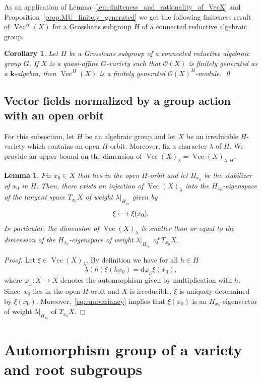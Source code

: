 \documentclass[JEP,XML,SOM,Unicode]{cedram}
\let\mathcal\mathscr
\def\mto{\mathchoice{\longmapsto}{\mapsto}{\mapsto}{\mapsto}}
\theoremstyle{plain}
\newtheorem{lemma}[theorem]{Lemma}
\newtheorem{corollary}[theorem]{Corollary}
\theoremstyle{definition}
\DeclareMathOperator{\Ve}{Vec}
\newcommand{\OO}{\mathcal{O}}
\newcommand{\kk}{{\boldsymbol{k}}}
\begin{document}
As an application of Lemma~\ref{lem.finiteness_and_rationality_of_VecX} and
Proposition~\ref{prop.MU_finitely_generated} we get the following
finiteness result of $\Ve^{H}(X)$ for a Grosshans subgroup $H$ of a connected reductive
algebraic group.

\begin{corollary}
\label{cor.VecUX_finitely_generated}
Let $H$ be a Grosshans subgroup of a connected reductive algebraic group
$G$. If $X$ is a quasi-affine $G$-variety
such that $\OO(X)$ is finitely generated as a $\kk$-algebra, then
$\Ve^{H}(X)$ is a finitely generated $\OO(X)^{H}$-module. \qed
\end{corollary}

\subsection{Vector fields normalized by a group action with an open orbit}

For this subsection, let $H$ be an algebraic group and let $X$ be an irreducible
$H$-variety which contains an open $H$-orbit.
Moreover, fix a character $\lambda$ of $H$. We provide an upper bound on the dimension of
$\Ve(X)_\lambda = \Ve(X)_{\lambda, H}$.

\begin{lemma}
\label{lem:Normalized_Derivations}
Fix $x_0 \in X$ that lies in the open $H$-orbit and let $H_{x_0}$ be
the stabilizer of $x_0$ in $H$. Then, there exists an injection
of $\Ve(X)_\lambda$ into the $H_{x_0}$-eigenspace of the tangent space $T_{x_0} X$
of weight $\lambda |_{H_{x_0}}$ given by
\[
\xi \mto \xi(x_0).
\]
In particular, the dimension of $\Ve(X)_\lambda$ is smaller than or equal to the
dimension of the
$H_{x_0}$-eigenspace of weight $\lambda |_{H_{x_0}}$ of $T_{x_0} X$.
\end{lemma}

\begin{proof}
Let $\xi \in \Ve(X)_\lambda$. By definition we have for all $h \in H$
\[
\label{eq:equivariancy}
\tag{$\varobar$}
\lambda(h) \xi(hx_0) = \textrm{d} \varphi_h \xi(x_0),
\]
where $\varphi_h \colon X \to X$ denotes the automorphism given by
multiplication with $h$. Since~$x_0$ lies in the open $H$-orbit and $X$ is irreducible,
$\xi$ is uniquely determined by $\xi(x_0)$. Moreover,~\eqref{eq:equivariancy} implies that $\xi(x_0)$ is an
$H_{x_0}$-eigenvector of weight $\lambda |_{H_{x_0}}$ of $T_{x_0} X$.
\end{proof}

\section{Automorphism group of a variety and root subgroups}
\label{sec.AutomorphismGroups}
\end{document}
